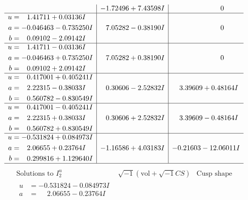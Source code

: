 \documentclass[1p]{elsarticle_modified}
\theoremstyle{definition}
\newcommand{\I}{\sqrt{-1}}
\begin{document}
$$\begin{array}{c|c|c}
 & -1.72496 + 7.43598 I & \phantom{-0.000000 } 0 \\ \hline\begin{aligned}
u &= \phantom{-}1.41711 + 0.03136 I \\
a &= -0.046463 - 0.735250 I \\
b &= \phantom{-}0.09102 - 2.09142 I\end{aligned}
 & \phantom{-}7.05282 - 0.38190 I & \phantom{-0.000000 } 0 \\ \hline\begin{aligned}
u &= \phantom{-}1.41711 - 0.03136 I \\
a &= -0.046463 + 0.735250 I \\
b &= \phantom{-}0.09102 + 2.09142 I\end{aligned}
 & \phantom{-}7.05282 + 0.38190 I & \phantom{-0.000000 } 0 \\ \hline\begin{aligned}
u &= \phantom{-}0.417001 + 0.405241 I \\
a &= \phantom{-}2.22315 - 0.38033 I \\
b &= \phantom{-}0.560782 - 0.830549 I\end{aligned}
 & \phantom{-}0.30606 - 2.52832 I & \phantom{-}3.39609 + 0.48164 I \\ \hline\begin{aligned}
u &= \phantom{-}0.417001 - 0.405241 I \\
a &= \phantom{-}2.22315 + 0.38033 I \\
b &= \phantom{-}0.560782 + 0.830549 I\end{aligned}
 & \phantom{-}0.30606 + 2.52832 I & \phantom{-}3.39609 - 0.48164 I \\ \hline\begin{aligned}
u &= -0.531824 + 0.084973 I \\
a &= \phantom{-}2.06655 + 0.23764 I \\
b &= \phantom{-}0.299816 + 1.129640 I\end{aligned}
 & -1.16586 + 4.03183 I & -0.21603 - 12.06011 I\\
 \hline 
 \end{array}$$\newpage$$\begin{array}{c|c|c}  
\text{Solutions to }I^u_{2}& \I (\text{vol} + \sqrt{-1}CS) & \text{Cusp shape}\\
 \hline 
\begin{aligned}
u &= -0.531824 - 0.084973 I \\
a &= \phantom{-}2.06655 - 0.23764 I \\

\end{aligned}
\end{array}$$
\end{document}

